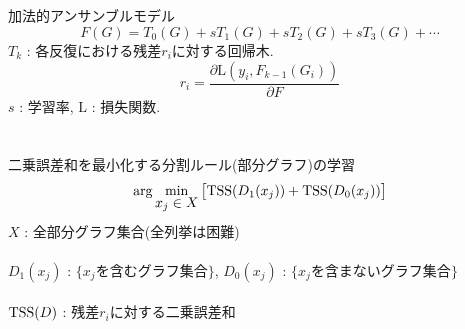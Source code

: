 \begin{tcolorbox}[colbacktitle=gray, title={\fontsize{35pt}{0pt}\selectfont 非線形グラフ分類回帰モデル}]
	 \\
	\vspace{10pt}\\
	

	 \\
	\vspace{10pt}\\
	加法的アンサンブルモデル
	\begin{equation*}
		F(G) = T_0(G) + s T_1(G) + s T_2(G) + s T_3(G) + \cdots
	\end{equation*}
	$T_k$ : 各反復における残差$r_i$に対する回帰木.
	\begin{equation*}
		r_i = \frac{\partial \mathrm{L}(y_i, F_{k-1}(G_i))}{\partial F}
	\end{equation*}
	\color{ash}
	$s$ : 学習率, \hspace{10pt} $\mathrm{L}$ : 損失関数.
	\vspace{30pt}\\

	\color{black}
	 \\
	\vspace{10pt}\\
	二乗誤差和を最小化する分割ルール(部分グラフ)の学習
	\begin{equation*}
		\arg\mymin{x_j \in X} \big[ \TSS(D_1(x_j)) + \TSS(D_0(x_j)) \big]
		\label{min:internal}
		\vspace{-5pt}
	\end{equation*}
	$X$ : 全部分グラフ集合(\alert{全列挙は困難}) \\
	\vspace{5pt}\\
	$D_1(x_j)$ : $ \{x_j$を含むグラフ集合$\}$, \hspace{30pt} $D_0(x_j)$ : $ \{x_j$を含まないグラフ集合$\}$ \\
	\vspace{5pt}\\
	$\mathrm{TSS}(D)$ : 残差$r_i$に対する二乗誤差和 \\
	\vspace{-10pt}
\end{tcolorbox}
